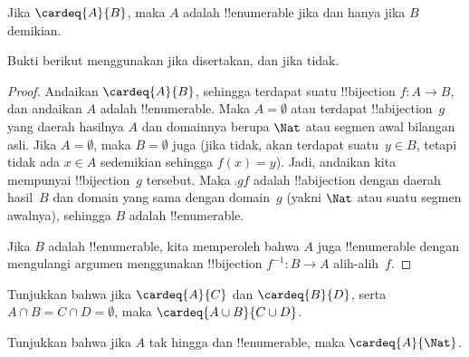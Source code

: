 \documentclass[../../../include/open-logic-section]{subfiles}
\begin{document}
\begin{prop}
Jika $\cardeq{A}{B}$, maka $A$ adalah !!{enumerable} jika dan hanya jika $B$
demikian.
\end{prop}

\begin{editorial}
Bukti berikut menggunakan  jika
 disertakan, dan  jika tidak.
\end{editorial}

\begin{proof}
Andaikan $\cardeq{A}{B}$, sehingga terdapat suatu !!{bijection} $f \colon A
\to B$, dan andaikan $A$ adalah !!{enumerable}.
{
  Maka $A = \emptyset$ atau terdapat !!a{bijection}~$g$ yang daerah hasilnya
  $A$ dan domainnya berupa $\Nat$ atau segmen awal bilangan asli. Jika $A =
  \emptyset$, maka $B = \emptyset$ juga (jika tidak, akan terdapat suatu~$y
  \in B$, tetapi tidak ada $x \in A$ sedemikian sehingga $f(x) = y$). Jadi,
  andaikan kita mempunyai !!{bijection}~$g$ tersebut. Maka $\comp{g}{f}$
  adalah !!a{bijection} dengan daerah hasil~$B$ dan domain yang sama dengan
  domain~$g$ (yakni $\Nat$ atau suatu segmen awalnya), sehingga $B$ adalah
  !!{enumerable}.}

Jika $B$ adalah !!{enumerable}, kita memperoleh bahwa $A$ juga
!!{enumerable} dengan mengulangi argumen menggunakan !!{bijection}
$f^{-1}\colon B \to A$ alih-alih~$f$.
\end{proof}

\begin{prob}
Tunjukkan bahwa jika $\cardeq{A}{C}$ dan $\cardeq{B}{D}$, serta $A \cap B = C
\cap D = \emptyset$, maka $\cardeq{A \cup B}{C \cup D}$.
\end{prob}

\begin{prob}
Tunjukkan bahwa jika $A$ tak hingga dan !!{enumerable}, maka
$\cardeq{A}{\Nat}$.
\end{prob}
\end{document}

